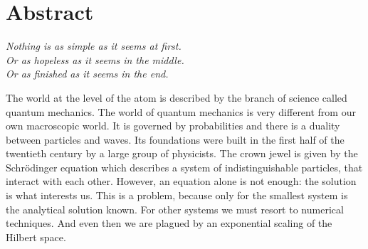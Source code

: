 \chapter{Abstract}
\setlength{\epigraphrule}{0pt}
\setlength{\epigraphwidth}{0.48\textwidth}
\epigraph{\textit{Nothing is as simple as it seems at first.\\Or as hopeless as it seems in the middle.\\Or as finished as it seems in the end.}}{}

The world at the level of the atom is described by the branch of science called quantum mechanics. 
The world of quantum mechanics is very different from our own macroscopic world. It is governed by probabilities and there is a duality
between particles and waves.
Its foundations were built in the first half of the twentieth century by a large group of physicists.
The crown jewel is given by the Schrödinger equation which describes a system of indistinguishable particles, that interact with each other.
However, an equation alone is not enough: the solution is what interests us. This is a problem, because only for the smallest system is the
analytical solution known. For other systems we must resort to numerical techniques. And even then we are plagued by an exponential scaling
of the Hilbert space.



